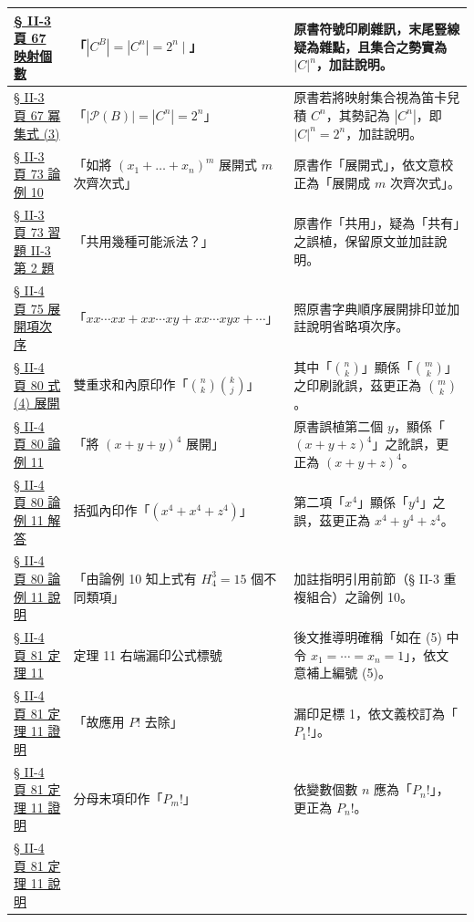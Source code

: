 \documentclass[a4paper,12pt,twoside]{article}
\begin{document}
\begin{xltabular}{\textwidth}{|p{3.2cm}|p{3.8cm}|X|}
\hline
\hyperref[note:b5s-ch2-p77-cb]{§ II-3 頁 67 映射個數} & 
「$|C^B| = |C^n| = 2^n \mid$」 & 
原書符號印刷雜訊，末尾豎線疑為雜點，且集合之勢實為 $|C|^n$，加註說明。 \\
\hline
\hyperref[note:b5s-ch2-p77-pn]{§ II-3 頁 67 冪集式 (3)} & 
「$|\mathscr{P}(B)| = |C^n| = 2^n$」 & 
原書若將映射集合視為笛卡兒積 $C^n$，其勢記為 $|C^n|$，即 $|C|^n = 2^n$，加註說明。 \\
\hline
\hyperref[note:b5s-ch2-p83-zhankai]{§ II-3 頁 73 論例 10} & 
「如將 $(x_1 + \dots + x_n)^m$ 展開式 $m$ 次齊次式」 & 
原書作「展開式」，依文意校正為「展開成 $m$ 次齊次式」。 \\
\hline
\hyperref[note:b5s-ch2-p83-gongyong]{§ II-3 頁 73 習題 II-3 第 2 題} & 
「共用幾種可能派法？」 & 
原書作「共用」，疑為「共有」之誤植，保留原文並加註說明。 \\
\hline
\hyperref[note:b5s-ch2-p85-expand]{§ II-4 頁 75 展開項次序} & 
「$xx\cdots xx + xx\cdots xy + xx\cdots xyx + \cdots$」 & 
照原書字典順序展開排印並加註說明省略項次序。 \\
\hline
\hyperref[note:b5s-ch2-p90-binom]{§ II-4 頁 80 式 (4) 展開} & 
雙重求和內原印作「$\binom{n}{k} \binom{k}{j}$」 & 
其中「$\binom{n}{k}$」顯係「$\binom{m}{k}$」之印刷訛誤，茲更正為 $\binom{m}{k}$。 \\
\hline
\hyperref[note:b5s-ch2-p90-ex11-typo]{§ II-4 頁 80 論例 11} & 
「將 $(x+y+y)^4$ 展開」 & 
原書誤植第二個 $y$，顯係「$(x+y+z)^4$」之訛誤，更正為 $(x+y+z)^4$。 \\
\hline
\hyperref[note:b5s-ch2-p90-ex11-y4]{§ II-4 頁 80 論例 11 解答} & 
括弧內印作「$(x^4 + x^4 + z^4)$」 & 
第二項「$x^4$」顯係「$y^4$」之誤，茲更正為 $x^4 + y^4 + z^4$。 \\
\hline
\hyperref[note:b5s-ch2-p90-disc10]{§ II-4 頁 80 論例 11 說明} & 
「由論例 10 知上式有 $H_4^3 = 15$ 個不同類項」 & 
加註指明引用前節（§ II-3 重複組合）之論例 10。 \\
\hline
\hyperref[note:b5s-ch2-p91-eq5]{§ II-4 頁 81 定理 11} & 
定理 11 右端漏印公式標號 & 
後文推導明確稱「如在 (5) 中令 $x_1 = \cdots = x_n = 1$」，依文意補上編號 (5)。 \\
\hline
\hyperref[note:b5s-ch2-p91-p1]{§ II-4 頁 81 定理 11 證明} & 
「故應用 $P!$ 去除」 & 
漏印足標 1，依文義校訂為「$P_1!$」。 \\
\hline
\hyperref[note:b5s-ch2-p91-pm]{§ II-4 頁 81 定理 11 證明} & 
分母末項印作「$P_m!$」 & 
依變數個數 $n$ 應為「$P_n!$」，更正為 $P_n!$。 \\
\hline
\hyperref[note:b5s-ch2-p91-right]{§ II-4 頁 81 定理 11 說明} & 

\end{xltabular}
\end{document}

